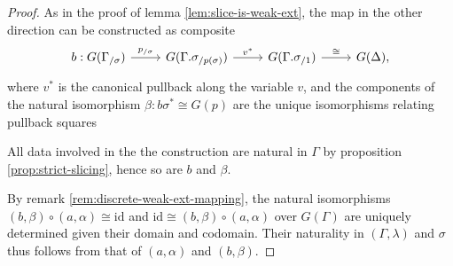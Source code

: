\documentclass[a4paper]{article}
\theoremstyle{remark}
\theoremstyle{definition}
\begin{document}
\begin{proof}
  As in the proof of lemma \ref{lem:slice-is-weak-ext}, the map in the other direction can be constructed as composite
  \begin{equation}
    \begin{tikzcd}
      b : G(\Gamma_{/ \sigma}) \arrow[r, "p_{/ \sigma}"] & G(\Gamma.\sigma_{/ p(\sigma)}) \arrow[r, "v^*"] & G(\Gamma.\sigma_{/ 1}) \arrow[r, "\cong"] & G(\Delta),
    \end{tikzcd}
  \end{equation}
  where $v^*$ is the canonical pullback along the variable $v$, and the components of the natural isomorphism $\beta : b \sigma^* \cong G(p)$ are the unique isomorphisms relating pullback squares
  All data involved in the the construction are natural in $\Gamma$ by proposition \ref{prop:strict-slicing}, hence so are $b$ and $\beta$.

  By remark \ref{rem:discrete-weak-ext-mapping}, the natural isomorphisms $(b, \beta) \circ (a, \alpha) \cong \mathrm{id}$ and $\mathrm{id} \cong (b, \beta) \circ (a, \alpha)$ over $G(\Gamma)$ are uniquely determined given their domain and codomain.
  Their naturality in $(\Gamma, \lambda)$ and $\sigma$ thus follows from that of $(a, \alpha)$ and $(b, \beta)$.
\end{proof}
\end{document}
